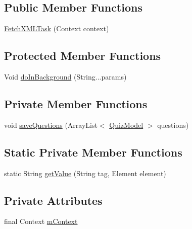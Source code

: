 \subsection*{Public Member Functions}
\begin{DoxyCompactItemize}
\item 
\hyperlink{classorg_1_1buildmlearn_1_1quiztime_1_1data_1_1FetchXMLTask_aaa03981dded3a75c1c1e78af9e1d4d21}{Fetch\+X\+M\+L\+Task} (Context context)
\end{DoxyCompactItemize}
\subsection*{Protected Member Functions}
\begin{DoxyCompactItemize}
\item 
Void \hyperlink{classorg_1_1buildmlearn_1_1quiztime_1_1data_1_1FetchXMLTask_a7299efff73c4aa44700f4216ff21f6ab}{do\+In\+Background} (String...\+params)
\end{DoxyCompactItemize}
\subsection*{Private Member Functions}
\begin{DoxyCompactItemize}
\item 
void \hyperlink{classorg_1_1buildmlearn_1_1quiztime_1_1data_1_1FetchXMLTask_a619252d4e82a7efd5658de1f028562bd}{save\+Questions} (Array\+List$<$ \hyperlink{classorg_1_1buildmlearn_1_1quiztime_1_1data_1_1QuizModel}{Quiz\+Model} $>$ questions)
\end{DoxyCompactItemize}
\subsection*{Static Private Member Functions}
\begin{DoxyCompactItemize}
\item 
static String \hyperlink{classorg_1_1buildmlearn_1_1quiztime_1_1data_1_1FetchXMLTask_a3733dc6c3389abb79bdbd6f32bfda889}{get\+Value} (String tag, Element element)
\end{DoxyCompactItemize}
\subsection*{Private Attributes}
\begin{DoxyCompactItemize}
\item 
final Context \hyperlink{classorg_1_1buildmlearn_1_1quiztime_1_1data_1_1FetchXMLTask_a04f2fefa924ca932a4993aa9dd3f8e72}{m\+Context}
\end{DoxyCompactItemize}


